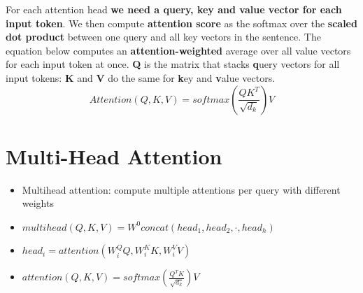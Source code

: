 \documentclass{article}
\begin{document}
For each attention head \textbf{we need a query, key and value vector for each input token}. We then compute \textbf{attention score} as the softmax over the \textbf{scaled dot product} between one query and all key vectors in the sentence. The equation below computes an \textbf{  attention-weighted } average over all value vectors for each input token at once. \textbf{Q} is the matrix that stacks \textbf{q}uery vectors for all input tokens: \textbf{K} and \textbf{V} do the same for \textbf{k}ey and \textbf{v}alue vectors.
\begin{equation}
    Attention(Q,K,V) = softmax (\frac{QK^T}{\sqrt{d_k}})V
\end{equation}
\section{Multi-Head Attention}
\begin{itemize}
    \item Multihead attention: compute multiple attentions per query with different weights
    \item $multihead(Q,K,V) = W^0 concat(head_1, head_2, \cdot , head_h)$ 
    \item $ head_i = attention(W_i^QQ, W_i^K K, W_i^V V )$
    \item $attention(Q,K,V) = softmax(\frac{Q^T K}{\sqrt{d_k}} )V$ 
\end{itemize}
\end{document}
